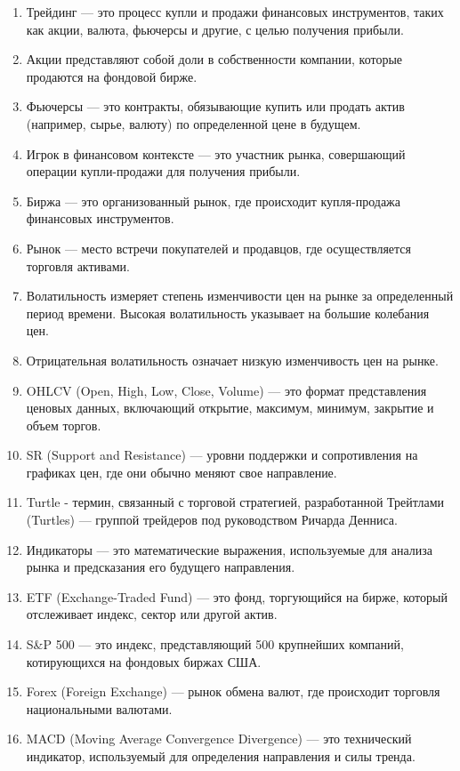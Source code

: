 \documentclass[a4paper,14pt]{extarticle}
\begin{document}
\begin{enumerate}
    \item Трейдинг — это процесс купли и продажи финансовых инструментов, таких как акции, валюта, фьючерсы и другие, с целью получения прибыли.
\item  Акции представляют собой доли в собственности компании, которые продаются на фондовой бирже.
\item  Фьючерсы — это контракты, обязывающие купить или продать актив (например, сырье, валюту) по определенной цене в будущем.
\item  Игрок в финансовом контексте — это участник рынка, совершающий операции купли-продажи для получения прибыли.
\item  Биржа — это организованный рынок, где происходит купля-продажа финансовых инструментов.
\item  Рынок — место встречи покупателей и продавцов, где осуществляется торговля активами.
\item  Волатильность измеряет степень изменчивости цен на рынке за определенный период времени. Высокая волатильность указывает на большие колебания цен.
\item  Отрицательная волатильность означает низкую изменчивость цен на рынке.
\item OHLCV (Open, High, Low, Close, Volume) — это формат представления ценовых данных, включающий открытие, максимум, минимум, закрытие и объем торгов.
\item SR (Support and Resistance) — уровни поддержки и сопротивления на графиках цен, где они обычно меняют свое направление.
\item Turtle - термин, связанный с торговой стратегией, разработанной Трейтлами (Turtles) — группой трейдеров под руководством Ричарда Денниса.
\item Индикаторы — это математические выражения, используемые для анализа рынка и предсказания его будущего направления.
\item ETF (Exchange-Traded Fund) — это фонд, торгующийся на бирже, который отслеживает индекс, сектор или другой актив.
\item S\&P 500 — это индекс, представляющий 500 крупнейших компаний, котирующихся на фондовых биржах США.
\item Forex (Foreign Exchange) — рынок обмена валют, где происходит торговля национальными валютами.
\item MACD (Moving Average Convergence Divergence) — это технический индикатор, используемый для определения направления и силы тренда.

\end{enumerate}
\end{document}
